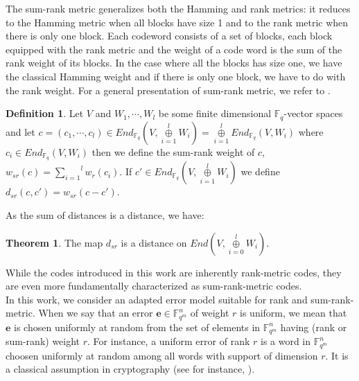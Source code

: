 \documentclass{article}
\newcommand{\tmop}[1]{#1}          %
\newcommand{\Fqm}{\mathbb{F}_{q^m}}
\theoremstyle{definition}
\newtheorem{theorem}{Theorem}
\newtheorem{definition}{Definition}
\begin{document}
\noindent The sum-rank metric generalizes both the Hamming and rank metrics: it reduces to the Hamming metric when all blocks have size 1 and to the rank metric when there is only one block. Each codeword consists of a set of blocks, each block equipped with the rank
metric and the weight of a code word is the sum of the rank weight of its
blocks. In the case where all the blocks has size one, we have the classical
Hamming weight and if there is only one block, we have to do with the rank
weight. For a general presentation of sum-rank metric, we refer to \cite{martinez-penas_codes_2022}.

\begin{definition}
      Let $V$ and $W_1, \cdots, W_l$ be some finite dimensional
      $\mathbb{F}_q$-vector spaces and let $c = (c_1, \cdots, c_l) \in
            \tmop{End}_{\mathbb{F}_q} \left( V, \underset{i = 1}{\overset{l}{\oplus}}
            W_i \right) = \underset{i = 1}{\overset{l}{\oplus}}
            \tmop{End}_{\mathbb{F}_q} (V, W_i)$ where $c_i \in \tmop{End}_{\mathbb{F}_q}
            (V, W_i)$ then we define the sum-rank weight of $c$, $w_{s r} (c) =
            \overset{l}{\underset{i = 1}{\sum}} w_r (c_i)$. If $c' \in
            \tmop{End}_{\mathbb{F}_q} \left( V, \underset{i = 1}{\overset{l}{\oplus}}
            W_i \right)$ we define $d_{s r} (c, c') = w_{s r} (c - c')$.
\end{definition}

As the sum of distances is a distance, we have:

\begin{theorem}
      The map $d_{s r}$ is a distance on $\tmop{End} \left( V, \underset{i =
                  0}{\overset{l}{\oplus}} W_i \right)$.
\end{theorem}

\noindent While the codes introduced in this work are inherently rank-metric codes, they are even more fundamentally characterized as sum-rank-metric codes.\\


In this work, we consider an adapted error model suitable for rank and sum-rank-metric. When we say that an error $\mathbf{e} \in \Fqm^n$ of weight $r$ is uniform, we mean that $\mathbf{e}$ is chosen uniformly at random from the set of elements in $\Fqm^n$ having (rank or sum-rank) weight $r$. For instance, a uniform error of rank $r$ is a word in $\Fqm^n$ choosen uniformly at random among all  words with support of dimension $r$.
It is a classical assumption in cryptography (see for instance\cite{aragon_minrank_2025-1}, \cite{gaborit_low_2013}).
\color{black}
\end{document}
